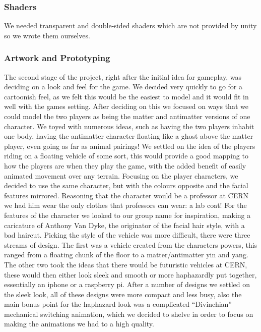 \documentclass[a4paper,oneside]{memoir}
\begin{document}
            \subsubsection{Shaders}
                We needed transparent and double-sided shaders which are not provided by unity so we wrote them ourselves.

            \subsubsection{Artwork and Prototyping}
            	The second stage of the project, right after the initial idea for gameplay, was deciding on a look and feel for the game. 
				We decided very quickly to go for a cartoonish feel, as we felt this would be the easiest to model and it would fit in well with the games setting. 
				After deciding on this we focused on ways that we could model the two players as being the matter and antimatter versions of one character. 
				We toyed with numerous ideas, such as having the two players inhabit one body, having the antimatter character floating like a ghost above the matter player, even going as far as animal pairings! 
				We settled on the idea of the players riding on a floating vehicle of some sort, this would provide a good mapping to how the players are when they play the game, with the added benefit of easily animated movement over any terrain. 
				Focusing on the player characters, we decided to use the same character, but with the colours opposite and the facial features mirrored. 
				Reasoning that the character would be a professor at CERN we had him wear the only clothes that professors can wear: a lab coat! 
				For the features of the character we looked to our group name for inspiration, making a caricature of Anthony Van Dyke, the originator of the facial hair style, with a bad haircut. 
				Picking the style of the vehicle was more difficult, there were three streams of design. 
      			The first was a vehicle created from the characters powers, this ranged from a floating chunk of the floor to a matter/antimatter yin and yang. 
				The other two took the ideas that there would be futuristic vehicles at CERN, these would then either look sleek and smooth or more haphazardly put together, essentially an iphone or a raspberry pi. 
				After a number of designs we settled on the sleek look, all of these designs were more compact and less busy, also the main bonus point for the haphazard look was a complicated “Divinchian” mechanical switching animation, which we decided to shelve in order to focus on making the animations we had to a high quality. 
\end{document}
